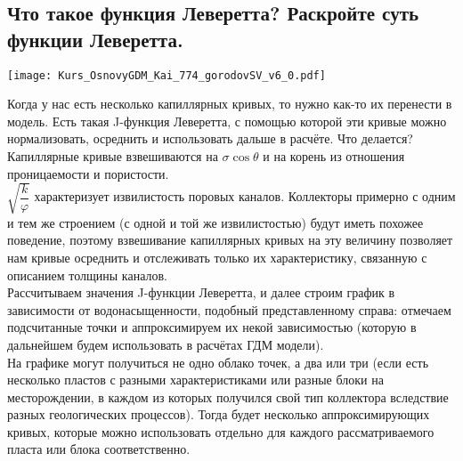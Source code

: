 

\subsection{Что такое функция Леверетта? Раскройте суть функции Леверетта.}

\texttt{[image: Kurs\_OsnovyGDM\_Kai\_774\_gorodovSV\_v6\_0.pdf]}

Когда у нас есть несколько капиллярных кривых, то нужно как-то их перенести в модель.
Есть такая J-функция Леверетта, с помощью которой эти кривые можно нормализовать, осреднить и использовать дальше в расчёте.
Что делается? Капиллярные кривые взвешиваются на $\sigma \cos\theta$ и на корень из отношения проницаемости и пористости.
\\

$\sqrt{\dfrac{k}{\varphi}}$ характеризует извилистость поровых каналов.
Коллекторы примерно с одним и тем же строением (с одной и той же извилистостью) будут иметь похожее поведение, поэтому взвешивание капиллярных кривых на эту величину позволяет нам кривые осреднить и отслеживать только их характеристику, связанную с описанием толщины каналов.
\\

Рассчитываем значения J-функции Леверетта, и далее строим график в зависимости от водонасыщенности, подобный представленному справа: отмечаем подсчитанные точки и аппроксимируем их некой зависимостью (которую в дальнейшем будем использовать в расчётах ГДМ модели).
\\

На графике могут получиться не одно облако точек, а два или три (если есть несколько пластов с разными характеристиками или разные блоки на месторождении, в каждом из которых получился свой тип коллектора вследствие разных геологических процессов).
Тогда будет несколько аппроксимирующих кривых, которые можно использовать отдельно для каждого рассматриваемого пласта или блока соответственно.


